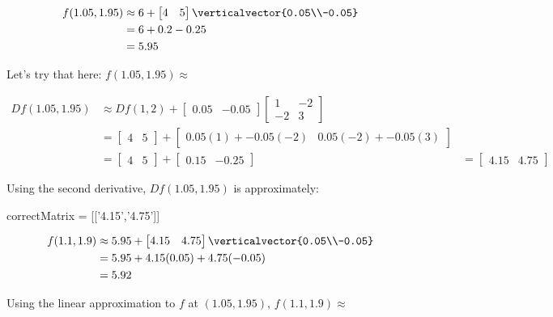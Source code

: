 \documentclass{ximera}
\begin{document}
\begin{question}
		\begin{solution}
			\begin{hint}
				\begin{align*}
					f(1.05,1.95) &\approx 6+\begin{bmatrix} 4 & 5 \end{bmatrix} \verticalvector{0.05\\-0.05}\\
							&=6+0.2-0.25\\
							&=5.95
				\end{align*}
			\end{hint}
			Let's try that here:  $f(1.05,1.95) \approx$ 
		\end{solution}
		\begin{solution}
			\begin{hint}
				\begin{align*}
					Df(1.05,1.95) &\approx Df(1,2)+\begin{bmatrix} 0.05 & -0.05\end{bmatrix}\begin{bmatrix} 1 & -2 \\ -2 & 3\end{bmatrix}\\
										&= \begin{bmatrix} 4 & 5 \end{bmatrix} + \begin{bmatrix} 0.05(1)+-0.05(-2) & 0.05(-2)+-0.05(3)\end{bmatrix}\\
										&=\begin{bmatrix} 4 & 5 \end{bmatrix} + \begin{bmatrix} 0.15 & -0.25\end{bmatrix}
										&=\begin{bmatrix} 4.15 & 4.75\end{bmatrix}
				\end{align*}
			\end{hint}
			Using the second derivative, $Df(1.05,1.95) $ is approximately:
			\begin{matrix-answer}
				correctMatrix = [['4.15','4.75']]
			\end{matrix-answer}
		\end{solution}
		\begin{solution}
				\begin{hint}
				\begin{align*}
					f(1.1,1.9) &\approx 5.95+\begin{bmatrix} 4.15 & 4.75 \end{bmatrix} \verticalvector{0.05\\-0.05}\\
							&=5.95+4.15(0.05)+4.75(-0.05)\\
							&=5.92
				\end{align*}
				\end{hint}
			Using the linear approximation to $f$ at $(1.05,1.95)$, $f(1.1,1.9) \approx$ \answer{$5.92$ }
		\end{solution}
		

\end{question}
\end{document}
